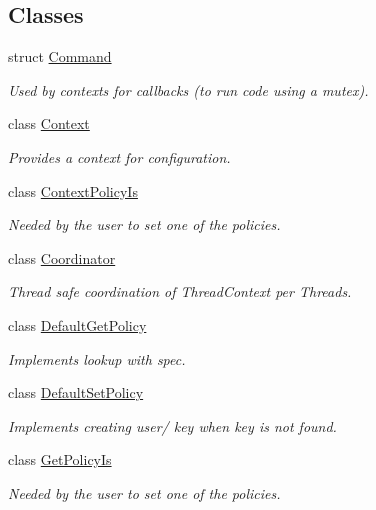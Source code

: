 \subsection*{Classes}
\begin{DoxyCompactItemize}
\item 
struct \hyperlink{structkdb_1_1Command}{Command}
\begin{DoxyCompactList}\small\item\em Used by contexts for callbacks (to run code using a mutex). \end{DoxyCompactList}\item 
class \hyperlink{classkdb_1_1Context}{Context}
\begin{DoxyCompactList}\small\item\em Provides a context for configuration. \end{DoxyCompactList}\item 
class \hyperlink{classkdb_1_1ContextPolicyIs}{Context\+Policy\+Is}
\begin{DoxyCompactList}\small\item\em Needed by the user to set one of the policies. \end{DoxyCompactList}\item 
class \hyperlink{classkdb_1_1Coordinator}{Coordinator}
\begin{DoxyCompactList}\small\item\em Thread safe coordination of Thread\+Context per Threads. \end{DoxyCompactList}\item 
class \hyperlink{classkdb_1_1DefaultGetPolicy}{Default\+Get\+Policy}
\begin{DoxyCompactList}\small\item\em Implements lookup with spec. \end{DoxyCompactList}\item 
class \hyperlink{classkdb_1_1DefaultSetPolicy}{Default\+Set\+Policy}
\begin{DoxyCompactList}\small\item\em Implements creating user/ key when key is not found. \end{DoxyCompactList}\item 
class \hyperlink{classkdb_1_1GetPolicyIs}{Get\+Policy\+Is}
\begin{DoxyCompactList}\small\item\em Needed by the user to set one of the policies. \end{DoxyCompactList}\item 

\end{DoxyCompactItemize}
